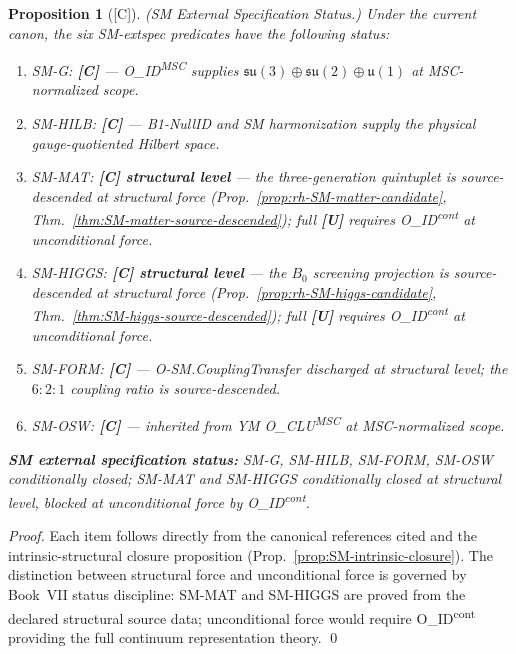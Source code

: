 \documentclass[12pt,oneside]{amsbook}
\theoremstyle{plain}
\newtheorem{proposition}[theorem]{Proposition}
\theoremstyle{definition}
\theoremstyle{remark}
\newcommand{\status}[1]{\textup{[#1]}}
\begin{document}
\begin{proposition}[\status{C}]\label{prop:SM-extspec-status}
\textup{(SM External Specification Status.)}
Under the current canon, the six SM-extspec predicates have the
following status:
\begin{enumerate}[label=\textup{(\arabic*)}]
 \item \emph{SM-G}: \textbf{[C]} --- O\_ID\textsuperscript{MSC}
 supplies $\mathfrak{su}(3)\oplus\mathfrak{su}(2)\oplus\mathfrak{u}(1)$
 at MSC-normalized scope.
 \item \emph{SM-HILB}: \textbf{[C]} --- B1-NullID and SM
 harmonization supply the physical gauge-quotiented Hilbert space.
 \item \emph{SM-MAT}: \textbf{[C] structural level} --- the
 three-generation quintuplet is source-descended at structural
 force (Prop.~\ref{prop:rh-SM-matter-candidate},
 Thm.~\ref{thm:SM-matter-source-descended});
 full \textbf{[U]} requires O\_ID\textsuperscript{cont} at
 unconditional force.
 \item \emph{SM-HIGGS}: \textbf{[C] structural level} --- the
 $B_0$ screening projection is source-descended at structural
 force (Prop.~\ref{prop:rh-SM-higgs-candidate},
 Thm.~\ref{thm:SM-higgs-source-descended});
 full \textbf{[U]} requires O\_ID\textsuperscript{cont} at
 unconditional force.
 \item \emph{SM-FORM}: \textbf{[C]} --- O-SM.CouplingTransfer
 discharged at structural level; the $6{:}2{:}1$ coupling ratio
 is source-descended.
 \item \emph{SM-OSW}: \textbf{[C]} --- inherited from YM
 O\_CLU\textsuperscript{MSC} at MSC-normalized scope.
\end{enumerate}
\textbf{SM external specification status:} \emph{SM-G, SM-HILB,
SM-FORM, SM-OSW conditionally closed; SM-MAT and SM-HIGGS
conditionally closed at structural level, blocked at unconditional
force by O\_ID\textsuperscript{cont}.}
\end{proposition}

\begin{proof}
Each item follows directly from the canonical references cited and
the intrinsic-structural closure proposition
(Prop.~\ref{prop:SM-intrinsic-closure}). The distinction between
structural force and unconditional force is governed by Book~VII
status discipline: SM-MAT and SM-HIGGS are proved from the declared
structural source data; unconditional force would require
O\_ID\textsuperscript{cont} providing the full continuum
representation theory.
\qed
\end{proof}
\end{document}
